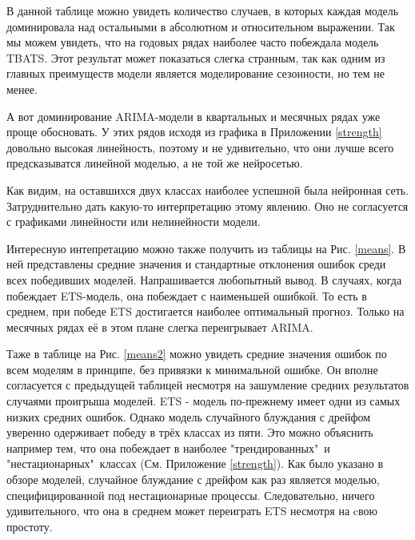 \documentclass[a4paper,12pt]{article}
\begin{document}
В данной таблице можно увидеть количество случаев, в которых каждая модель доминировала над остальными в абсолютном и относительном выражении. Так мы можем увидеть, что на годовых рядах наиболее часто побеждала модель TBATS. Этот результат может показаться слегка странным, так как одним из главных преимуществ модели является моделирование сезонности, но тем не менее. 

А вот доминирование ARIMA-модели в квартальных и месячных рядах уже проще обосновать. У этих рядов исходя из графика в Приложении \ref{strength} довольно высокая линейность, поэтому и не удивительно, что они лучше всего предсказыватся линейной моделью, а не той же нейросетью.

Как видим, на оставшихся двух классах наиболее успешной была нейронная сеть. Затруднительно дать какую-то интерпретацию этому явлению. Оно не согласуется с графиками линейности или нелинейности модели. 


Интересную интепретацию можно также получить из таблицы на Рис. \ref{means}. В ней представлены средние значения и стандартные отклонения ошибок среди всех победивших моделей. Напрашивается любопытный вывод. В случаях, когда побеждает ETS-модель, она побеждает с наименьшей ошибкой. То есть в среднем, при победе ETS достигается наиболее оптимальный прогноз. Только на месячных рядах её в этом плане слегка переигрывает ARIMA.

Таже в таблице на Рис. \ref{means2} можно увидеть средние  значения ошибок по всем моделям в принципе, без привязки к минимальной ошибке.	Он вполне согласуется с предыдущей таблицей несмотря на зашумление средних результатов случаями проигрыша моделей. ETS - модель по-прежнему имеет одни из самых низких средних ошибок. Однако модель случайного блуждания с дрейфом уверенно одерживает победу в трёх классах из пяти. Это можно объяснить например тем, что она побеждает в наиболее "трендированных"\ и "нестационарных"\ классах (См. Приложение \ref{strength}). Как было указано в обзоре моделей, случайное блуждание с дрейфом как раз является моделью, специфицированной под нестационарные процессы. Следовательно, ничего удивительного, что она в среднем может переиграть ETS несмотря на cвою простоту. 
\end{document}
